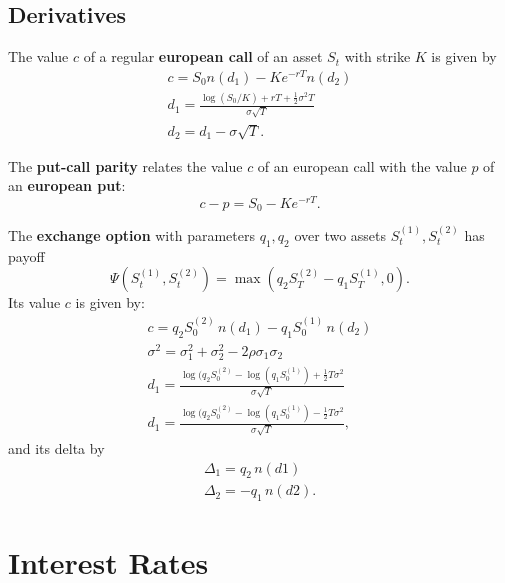 \subsection{Derivatives}
\begin{outline}
  \1 The value $c$ of a regular \textbf{european call} of an asset $S_t$ with strike $K$
  is given by
  \begin{gather*}
    c = S_0n(d_1) - Ke^{-rT}n(d_2)\\
    d_1 = \frac{\log(S_0/K) + rT + \tfrac{1}{2}\sigma^2T}{\sigma\sqrt{T}}\\
    d_2 = d_1 - \sigma\sqrt{T}.
  \end{gather*}

  \1 The \textbf{put-call parity} relates the value $c$ of an european call with the value
  $p$ of an \textbf{european put}:
  \begin{equation*}
    c - p = S_0 - Ke^{-rT}.
  \end{equation*}

  \1 The \textbf{exchange option} with parameters $q_1,q_2$ over two assets
  $S^{(1)}_t,S^{(2)}_t$ has payoff
  \begin{equation*}
    \Psi(S^{(1)}_t,S^{(2)}_t) = \max(q_2S^{(2)}_T - q_1S^{(1)}_T,0).
  \end{equation*}
  Its value $c$ is given by:
  \begin{gather*}
    c = q_2S^{(2)}_0\,n(d_1) - q_1S^{(1)}_0\,n(d_2)\\
    \sigma^2 = \sigma_1^2 + \sigma_2^2 - 2\rho\sigma_1\sigma_2\\
    d_1 = \frac{\log(q_2S^{(2)}_0 - \log(q_1S^{(1)}_0) +
      \tfrac{1}{2}T\sigma^2}{\sigma\sqrt{T}}\\
    d_1 = \frac{\log(q_2S^{(2)}_0 - \log(q_1S^{(1)}_0) -
      \tfrac{1}{2}T\sigma^2}{\sigma\sqrt{T}},
  \end{gather*}
  and its delta by
  \begin{gather*}
    \Delta_1 = q_2\,n(d1)\\
    \Delta_2 = -q_1\,n(d2).
  \end{gather*}
\end{outline}



\section{Interest Rates}


